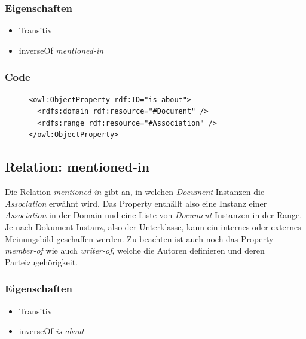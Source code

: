 \documentclass[
    11pt,
    latin1,
    a4paper,
    oneside
]{scrreprt}
\begin{document}
\subsubsection{Eigenschaften} \label{sec:rel_isabout_settings}

\begin{itemize}
  \item Transitiv
  \item inverseOf \emph{mentioned-in}
\end{itemize}

\subsubsection{Code} \label{sec:rel_isabout_code}

\begin{figure}[H]
 \lstset{language=XML}
 \begin{lstlisting}[label=owl:isabout,caption={Die Relation \emph{is-about} gibt an, \"uber welche \emph{Association} ein Dokument ist}]
<owl:ObjectProperty rdf:ID="is-about">
  <rdfs:domain rdf:resource="#Document" />
  <rdfs:range rdf:resource="#Association" />
</owl:ObjectProperty>
 \end{lstlisting}
\end{figure}


\subsection{Relation: mentioned-in} \label{sec:rel_mentionedin}

Die Relation \emph{mentioned-in} gibt an, in welchen \emph{Document} Instanzen die \emph{Association} erw\"ahnt wird. Das Property enth\"allt also eine Instanz einer \emph{Association} in der Domain und eine Liste von \emph{Document} Instanzen in der Range. Je nach Dokument-Instanz, also der Unterklasse, kann ein internes oder externes Meinungsbild geschaffen werden. Zu beachten ist auch noch das Property \emph{member-of} wie auch \emph{writer-of}, welche die Autoren definieren und deren Parteizugeh\"origkeit.

\subsubsection{Eigenschaften} \label{sec:rel_mentionedin_settings}

\begin{itemize}
  \item Transitiv
  \item inverseOf \emph{is-about}
\end{itemize}
\end{document}

